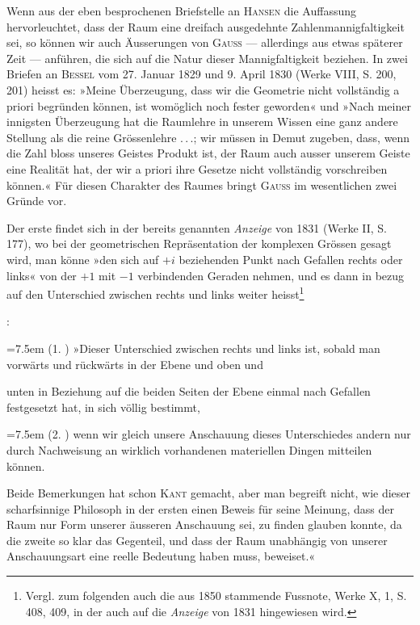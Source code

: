 Wenn aus der eben besprochenen Briefstelle an \textsc{Hansen} die Auffassung hervorleuchtet,
dass der Raum eine dreifach ausgedehnte Zahlenmannigfaltigkeit sei,
so können wir auch Äusserungen von \textsc{Gauss} — allerdings aus etwas späterer
Zeit — anführen, die sich auf die Natur dieser Mannigfaltigkeit beziehen. In
zwei Briefen an \textsc{Bessel} vom 27. Januar 1829 und 9. April 1830 (Werke VIII,
S. 200, 201) heisst es: »Meine Überzeugung, dass wir die Geometrie nicht
vollständig a priori begründen können, ist womöglich noch fester geworden«
und »Nach meiner innigsten Überzeugung hat die Raumlehre in unserem
Wissen eine ganz andere Stellung als die reine Grössenlehre \mbox{.\,.\,.}; wir müssen
in Demut zugeben, dass, wenn die Zahl bloss unseres Geistes Produkt ist, der
Raum auch ausser unserem Geiste eine Realität hat, der wir a priori ihre
Gesetze nicht vollständig vorschreiben können.« Für diesen 
Charakter des Raumes bringt \textsc{Gauss} im wesentlichen zwei Gründe vor.

Der erste findet sich in der bereits genannten \textit{Anzeige} von 1831 (Werke II,
S. 177), wo bei der geometrischen Repräsentation der komplexen Grössen gesagt
wird, man könne »den sich auf \(+i\) beziehenden Punkt nach Gefallen rechts
oder links« von der \(+1\) mit \(-1\) verbindenden Geraden nehmen, und es dann
in bezug auf den Unterschied zwischen rechts und links weiter heisst\begingroup\renewcommand{\thefootnote}{265a)}\footnote{Vergl. zum folgenden auch die aus 1850 stammende Fussnote, Werke X, 1, S. 408, 409, in der auch auf die \textit{Anzeige} von 1831 hingewiesen wird.}\addtocounter{footnote}{-1}\endgroup:
\par\noindent\hangindent=7.5em
(1. ) »Dieser Unterschied zwischen rechts und links ist, sobald
man vorwärts und rückwärts in der Ebene und oben und
\par\clearpage{}
\noindent\hspace*{7.5em}\begin{minipage}[t]{\dimexpr\linewidth-7.5em\relax}
unten in Beziehung auf die beiden Seiten der Ebene einmal
nach Gefallen festgesetzt hat, in sich völlig bestimmt,
\end{minipage}
\par\noindent\hangindent=7.5em
(2. ) wenn wir gleich unsere Anschauung dieses Unterschiedes
andern nur durch Nachweisung an wirklich vorhandenen
materiellen Dingen mitteilen können.
\par\noindent Beide Bemerkungen hat schon \textsc{Kant} gemacht, aber man begreift nicht, wie
dieser scharfsinnige Philosoph in der ersten einen Beweis für seine Meinung,
dass der Raum nur Form unserer äusseren Anschauung sei, zu finden glauben
konnte, da die zweite so klar das Gegenteil, und dass der Raum unabhängig
von unserer Anschauungsart eine reelle Bedeutung haben muss, beweiset.«

